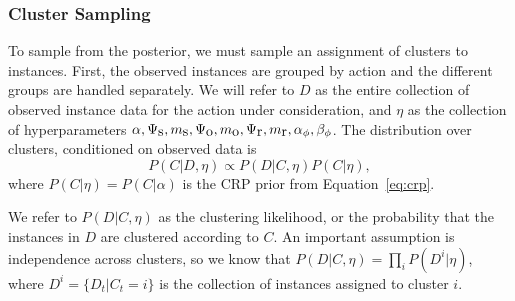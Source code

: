\subsubsection{Cluster Sampling}

To sample from the  posterior, we must sample an assignment of clusters to instances. First, the observed instances are grouped by action and the different groups are handled separately. We will refer to $D$ as the entire collection of observed instance data for the action under consideration, and $\eta$ as the collection of hyperparameters $\alpha, \Psi_{\mbox s}, m_{\mbox s},\Psi_{\mbox o}, m_{\mbox o},\Psi_{\mbox r}, m_{\mbox r},\alpha_\phi,\beta_\phi$. The distribution over clusters, conditioned on observed data is
$$P(C|D, \eta) \propto P(D|C, \eta)P(C|\eta),$$
where $P(C|\eta)=P(C|\alpha)$ is the CRP prior from Equation~\ref{eq:crp}.

We refer to $P(D|C, \eta)$ as the clustering likelihood, or the probability that the instances in $D$ are clustered according to $C$. An important assumption is independence across clusters, so we know that $P(D|C,\eta) = \prod_i P(D^i|\eta)$, where $D^i=\{D_t|C_t=i\}$ is the collection of instances assigned to cluster $i$.

